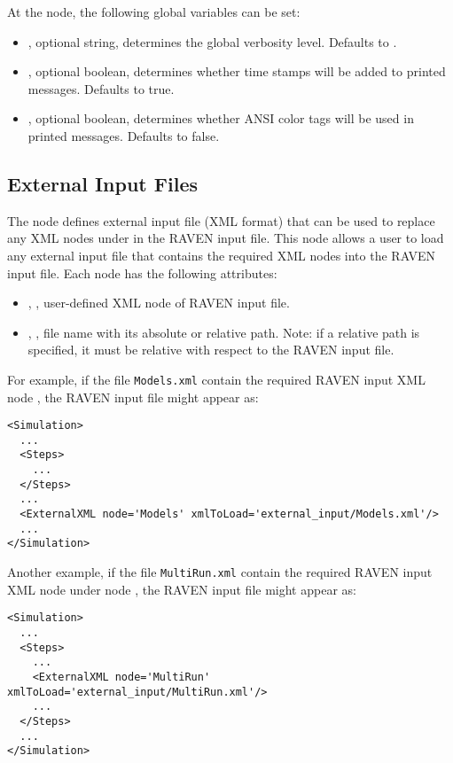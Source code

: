 At the  node, the following global variables can be set:
\begin{itemize}
  \item {}, optional string, determines the global verbosity level.  Defaults to
    .
  \item {}, optional boolean, determines whether time stamps will be added to printed
    messages.  Defaults to true.
  \item {}, optional boolean, determines whether ANSI color tags will be used in printed
    messages.  Defaults to false.
\end{itemize}


\subsection{External Input Files}
The  node defines external input file (XML format) that can be used to replace any XML nodes
under  in the RAVEN input file. This node allows a user to load any external input file that contains
the required XML nodes into the RAVEN input file. Each  node has the following attributes:
\begin{itemize}
\item {}, , user-defined XML node of RAVEN input file.
\item {}, , file name with its absolute or relative path. Note: if a
relative path is specified, it must be relative with respect to the RAVEN input file.
\end{itemize}
%
For example, if the file \texttt{Models.xml} contain the required RAVEN input XML node ,
the RAVEN input file might appear as:
%
\begin{lstlisting}[style=XML,morekeywords={node,xmlToLoad}]
<Simulation>
  ...
  <Steps>
    ...
  </Steps>
  ...
  <ExternalXML node='Models' xmlToLoad='external_input/Models.xml'/>
  ...
</Simulation>
\end{lstlisting}
%
Another example, if the file \texttt{MultiRun.xml} contain the required RAVEN input XML node 
under node , the RAVEN input file might appear as:
\begin{lstlisting}[style=XML,morekeywords={node,xmlToLoad}]
<Simulation>
  ...
  <Steps>
    ...
    <ExternalXML node='MultiRun' xmlToLoad='external_input/MultiRun.xml'/>
    ...
  </Steps>
  ...
</Simulation>
\end{lstlisting}
